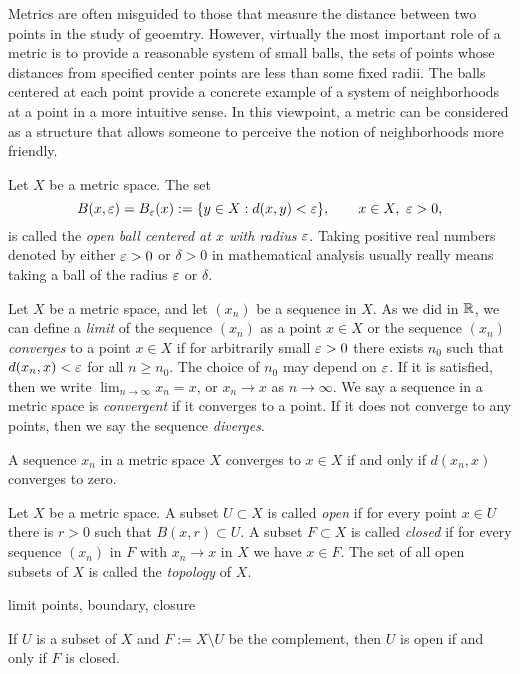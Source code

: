\documentclass{../../large}
\begin{document}
\begin{prb}
Metrics are often misguided to those that measure the distance between two points in the study of geoemtry.
However, virtually the most important role of a metric is to provide a reasonable system of small balls, the sets of points whose distances from specified center points are less than some fixed radii.
The balls centered at each point provide a concrete example of a system of neighborhoods at a point in a more intuitive sense.
In this viewpoint, a metric can be considered as a structure that allows someone to perceive the notion of neighborhoods more friendly.

Let $X$ be a metric space.
The set
\[B(x,\varepsilon)=B_\varepsilon(x):=\{y\in X:d(x,y)<\varepsilon\},\qquad x\in X,\ \varepsilon>0,\]
is called the \emph{open ball centered at $x$ with radius $\varepsilon$}.
Taking positive real numbers denoted by either $\varepsilon>0$ or $\delta>0$ in mathematical analysis usually really means taking a ball of the radius $\varepsilon$ or $\delta$.


\end{prb}


\begin{prb}
Let $X$ be a metric space, and let $(x_n)$ be a sequence in $X$.
As we did in $\mathbb{R}$, we can define a \emph{limit} of the sequence $(x_n)$ as a point $x\in X$ or the sequence $(x_n)$ \emph{converges} to a point $x\in X$ if for arbitrarily small $\varepsilon>0$ there exists $n_0$ such that $d(x_n,x)<\varepsilon$ for all $n\ge n_0$.
The choice of $n_0$ may depend on $\varepsilon$.
If it is satisfied, then we write $\lim_{n\to\infty}x_n=x$, or $x_n\to x$ as $n\to\infty$.
We say a sequence in a metric space is \emph{convergent} if it converges to a point.
If it does not converge to any points, then we say the sequence \emph{diverges}.
\begin{parts}
\item A sequence $x_n$ in a metric space $X$ converges to $x\in X$ if and only if $d(x_n,x)$ converges to zero.
\end{parts}
\end{prb}







\begin{prb}
Let $X$ be a metric space.
A subset $U\subset X$ is called \emph{open} if for every point $x\in U$ there is $r>0$ such that $B(x,r)\subset U$.
A subset $F\subset X$ is called \emph{closed} if for every sequence $(x_n)$ in $F$ with $x_n\to x$ in $X$ we have $x\in F$.
The set of all open subsets of $X$ is called the \emph{topology} of $X$.

limit points, boundary, closure
\begin{parts}
\item If $U$ is a subset of $X$ and $F:=X\setminus U$ be the complement, then $U$ is open if and only if $F$ is closed.
\end{parts}
\end{prb}
\end{document}
